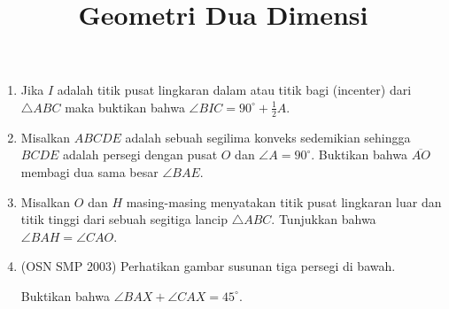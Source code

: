 \documentclass[a4paper, 12pt]{article}
\begin{document}
\title{Geometri Dua Dimensi}
\maketitle
\begin{enumerate}
\section{Angle Chasing}
    \item Jika $I$ adalah titik pusat lingkaran dalam atau titik bagi (incenter) dari $\triangle ABC$ maka buktikan bahwa
        $\angle BIC = 90^\circ + \frac{1}{2}A.$

    \item Misalkan $ABCDE$ adalah sebuah segilima konveks sedemikian sehingga $BCDE$ adalah persegi dengan pusat $O$ dan $\angle A = 90^\circ$. Buktikan bahwa $\overline{AO}$ membagi dua sama besar $\angle BAE$.

    \item Misalkan $O$ dan $H$ masing-masing menyatakan titik pusat lingkaran luar dan titik tinggi dari sebuah segitiga lancip $\triangle ABC$. Tunjukkan bahwa $\angle BAH = \angle CAO$.

    \item (OSN SMP 2003) Perhatikan gambar susunan tiga persegi di bawah. 
    
    Buktikan bahwa $\angle BAX+\angle CAX=45^{\circ}$.
    


\end{enumerate}
\end{document}
